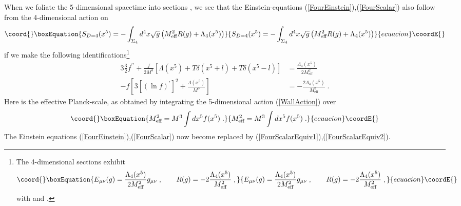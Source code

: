 \documentclass[a4paper,12pt]{article}
\begin{document}
When we foliate
the 5-dimensional spacetime into sections \coordHE{}, we see that the
Einstein-equations (\ref{FourEinstein}),(\ref{FourScalar}) also follow from
the 4-dimensional action on \coordHE{}
\begin{equation}\coord{}\boxEquation{
   S_{D=4}(x^5) =-\int_{\Sigma_4} d^4x \sqrt{g}\left( M^2_{\text{eff}} R(g)
                                          +\Lambda_4(x^5) 
                                    \right)
}{
   S_{D=4}(x^5) =-\int_{\Sigma_4} d^4x \sqrt{g}\left( M^2_{\text{eff}} R(g)
                                          +\Lambda_4(x^5) 
                                    \right)
}{ecuacion}\coordE{}\end{equation} 
if we make the following identifications\footnote{The 4-dimensional sections
  exhibit
                 \begin{equation*}\coord{}\boxEquation{
                    E_{\mu\nu}(g) = \frac{\Lambda_4(x^5)}{2M_{\text{eff}}^2}
                                    g_{\mu\nu} \; , \qquad
                    R(g) = -2\frac{\Lambda_4(x^5)}{M_{\text{eff}}^2} \; , 
                 }{
                    E_{\mu\nu}(g) = \frac{\Lambda_4(x^5)}{2M_{\text{eff}}^2}
                                    g_{\mu\nu} \; , \qquad
                    R(g) = -2\frac{\Lambda_4(x^5)}{M_{\text{eff}}^2} \; , 
                 }{ecuacion}\coordE{}\end{equation*}
  with \coordHE{} and \coordHE{}.}
\begin{alignat}{3}
    \frac{3}{2}f^{\prime\prime}+\frac{f}{2M^3}
    \left[ \Lambda(x^5)+T\delta(x^5+l)+T\delta(x^5-l) \right]
 &= \frac{\Lambda_4(x^5)}{2M_{\text{eff}}^2} 
     \label{FourScalarEquiv1} \\
    -f\left[3\left[(\ln f)^\prime\right]^2+\frac{\Lambda(x^5)}{M^3}
      \right]
 &= -\frac{2\Lambda_4(x^5)}{M_{\text{eff}}^2} \; .
     \label{FourScalarEquiv2} 
\end{alignat}
Here \coordHE{} is the effective Planck-scale, as obtained by
integrating the 5-dimensional action (\ref{WallAction}) over \coordHE{}
\begin{equation}\coord{}\boxEquation{
  M_{\text{eff}}^2 = M^3 \int dx^5 f(x^5) \; .
}{
  M_{\text{eff}}^2 = M^3 \int dx^5 f(x^5) \; .
}{ecuacion}\coordE{}\end{equation}
The Einstein equations (\ref{FourEinstein}),(\ref{FourScalar}) now become
replaced by (\ref{FourScalarEquiv1}),(\ref{FourScalarEquiv2}).
\end{document}

